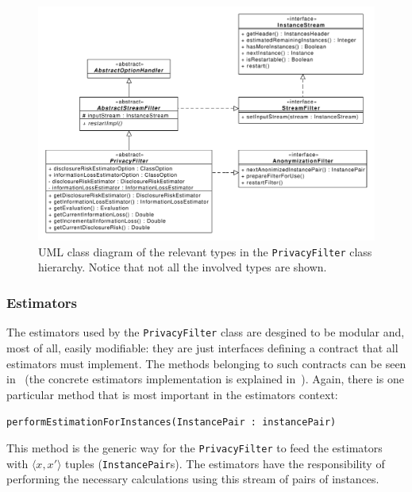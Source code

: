 \begin{figure}[h]
	\centering
	\includegraphics[width=1.0\textwidth]{figures/class_PrivacyFilter.pdf}
	\caption{UML class diagram of the relevant types in the \texttt{PrivacyFilter} class hierarchy. Notice that not all the involved types are shown.}
	\label{fig:privacy-filter-uml}
\end{figure}

\subsubsection*{Estimators}
\label{Implementation:PrivacyFilter:PrivacyFilter:Estimators}

The estimators used by the \texttt{PrivacyFilter} class are desgined to be modular and, most of all, easily modifiable: they are just interfaces defining a contract that all estimators must implement. The methods belonging to such contracts can be seen in~ (the concrete estimators implementation is explained in~). Again, there is one particular method that is most important in the estimators context:

\begin{center}
\texttt{performEstimationForInstances(InstancePair : instancePair)}
\end{center}

This method is the generic way for the \texttt{PrivacyFilter} to feed the estimators with $\langle x, x' \rangle$ tuples (\texttt{InstancePair}s). The estimators have the responsibility of performing the necessary calculations using this stream of pairs of instances.

